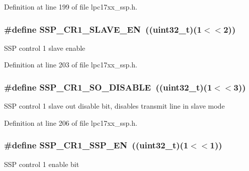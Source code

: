 \-Definition at line 199 of file lpc17xx\-\_\-ssp.\-h.

\hypertarget{group___s_s_p___private___macros_ga483d570ffc25bc917c99b3e8ece75649}{
\subsubsection[{\-S\-S\-P\-\_\-\-C\-R1\-\_\-\-S\-L\-A\-V\-E\-\_\-\-E\-N}]{\setlength{\rightskip}{0pt plus 5cm}\#define {\bf \-S\-S\-P\-\_\-\-C\-R1\-\_\-\-S\-L\-A\-V\-E\-\_\-\-E\-N}~((uint32\-\_\-t)(1$<$$<$2))}}\label{group___s_s_p___private___macros_ga483d570ffc25bc917c99b3e8ece75649}
\-S\-S\-P control 1 slave enable 

\-Definition at line 203 of file lpc17xx\-\_\-ssp.\-h.

\hypertarget{group___s_s_p___private___macros_gaf8cd75ca0bf07a236b992cca4769b4dc}{
\subsubsection[{\-S\-S\-P\-\_\-\-C\-R1\-\_\-\-S\-O\-\_\-\-D\-I\-S\-A\-B\-L\-E}]{\setlength{\rightskip}{0pt plus 5cm}\#define {\bf \-S\-S\-P\-\_\-\-C\-R1\-\_\-\-S\-O\-\_\-\-D\-I\-S\-A\-B\-L\-E}~((uint32\-\_\-t)(1$<$$<$3))}}\label{group___s_s_p___private___macros_gaf8cd75ca0bf07a236b992cca4769b4dc}
\-S\-S\-P control 1 slave out disable bit, disables transmit line in slave mode 

\-Definition at line 206 of file lpc17xx\-\_\-ssp.\-h.

\hypertarget{group___s_s_p___private___macros_gaad500ed8cec6c1734a12a7f55ff6ec26}{
\subsubsection[{\-S\-S\-P\-\_\-\-C\-R1\-\_\-\-S\-S\-P\-\_\-\-E\-N}]{\setlength{\rightskip}{0pt plus 5cm}\#define {\bf \-S\-S\-P\-\_\-\-C\-R1\-\_\-\-S\-S\-P\-\_\-\-E\-N}~((uint32\-\_\-t)(1$<$$<$1))}}\label{group___s_s_p___private___macros_gaad500ed8cec6c1734a12a7f55ff6ec26}
\-S\-S\-P control 1 enable bit 

